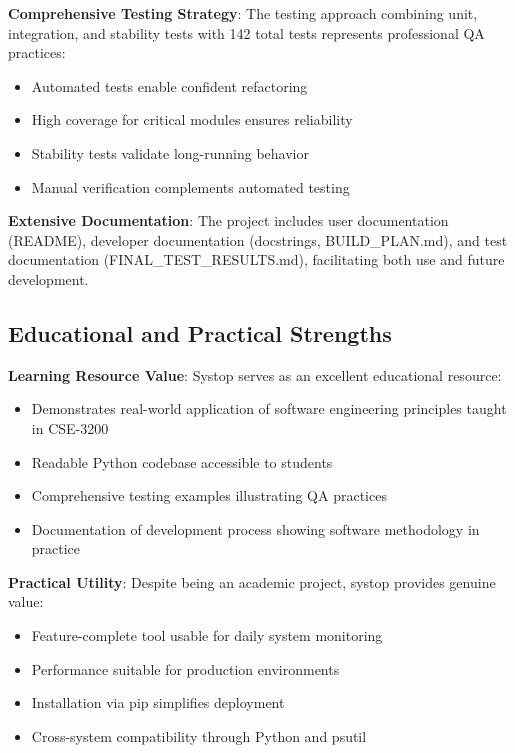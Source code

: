 \documentclass[12pt,a4paper,oneside]{report}
\begin{document}
\textbf{Comprehensive Testing Strategy}: The testing approach combining unit, integration, and stability tests with 142 total tests represents professional QA practices:
\begin{itemize}
    \item Automated tests enable confident refactoring
    \item High coverage for critical modules ensures reliability
    \item Stability tests validate long-running behavior
    \item Manual verification complements automated testing
\end{itemize}

\textbf{Extensive Documentation}: The project includes user documentation (README), developer documentation (docstrings, BUILD\_PLAN.md), and test documentation (FINAL\_TEST\_RESULTS.md), facilitating both use and future development.

\subsection{Educational and Practical Strengths}

\textbf{Learning Resource Value}: Systop serves as an excellent educational resource:
\begin{itemize}
    \item Demonstrates real-world application of software engineering principles taught in CSE-3200
    \item Readable Python codebase accessible to students
    \item Comprehensive testing examples illustrating QA practices
    \item Documentation of development process showing software methodology in practice
\end{itemize}

\textbf{Practical Utility}: Despite being an academic project, systop provides genuine value:
\begin{itemize}
    \item Feature-complete tool usable for daily system monitoring
    \item Performance suitable for production environments
    \item Installation via pip simplifies deployment
    \item Cross-system compatibility through Python and psutil
\end{itemize}
\end{document}
